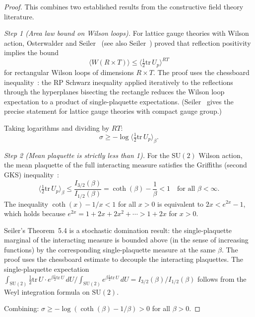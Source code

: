 \documentclass[11pt]{article}
\theoremstyle{definition}
\newcommand{\SU}{\mathrm{SU}}
\newcommand{\tr}{\mathrm{tr}}
\begin{document}
\begin{proof}
This combines two established results from the constructive field
theory literature.

\emph{Step 1 (Area law bound on Wilson loops).}
For lattice gauge theories with Wilson action,
Osterwalder and Seiler~\cite{OS78} (see also
Seiler~\cite[Chapter~6]{Seiler82}) proved that reflection positivity
implies the bound
\begin{equation}\label{eq:wilson-area}
\langle W(R\times T)\rangle
\le\bigl\langle\tfrac{1}{2}\tr\,U_p\bigr\rangle^{RT}
\end{equation}
for rectangular Wilson loops of dimensions $R\times T$.  The proof
uses the chessboard inequality~\cite[Theorem~4.1]{Seiler82}:
the RP Schwarz inequality applied iteratively to the reflections
through the hyperplanes bisecting the rectangle reduces the Wilson
loop expectation to a product of single-plaquette expectations.
(Seiler~\cite[Theorem~6.1]{Seiler82} gives the precise statement
for lattice gauge theories with compact gauge group.)

Taking logarithms and dividing by $RT$:
\begin{equation}
\sigma\ge-\log\bigl\langle\tfrac{1}{2}\tr\,U_p\bigr\rangle_\beta.
\end{equation}

\emph{Step 2 (Mean plaquette is strictly less than 1).}
For the $\SU(2)$ Wilson action, the mean plaquette of the full
interacting measure satisfies the Griffiths (second GKS)
inequality~\cite[Theorem~5.4]{Seiler82}:
\begin{equation}\label{eq:griffiths}
\bigl\langle\tfrac{1}{2}\tr\,U_p\bigr\rangle_\beta
\le\frac{I_{3/2}(\beta)}{I_{1/2}(\beta)}
=\coth(\beta)-\frac{1}{\beta}<1\quad\text{for all $\beta<\infty$.}
\end{equation}
The inequality $\coth(x)-1/x<1$ for all $x>0$ is equivalent
to $2x<e^{2x}-1$, which holds because
$e^{2x}=1+2x+2x^2+\cdots>1+2x$ for $x>0$.

Seiler's Theorem~5.4 is a stochastic domination result: the
single-plaquette marginal of the interacting measure is bounded
above (in the sense of increasing functions) by the corresponding
single-plaquette measure at the same $\beta$.  The proof uses
the chessboard estimate to decouple the interacting plaquettes.
The single-plaquette expectation
$\int_{\SU(2)}\frac{1}{2}\tr\,U\cdot
e^{\beta\frac{1}{2}\tr\,U}\,dU
/\int_{\SU(2)}e^{\beta\frac{1}{2}\tr\,U}\,dU
=I_{3/2}(\beta)/I_{1/2}(\beta)$
follows from the Weyl integration formula on $\SU(2)$.

Combining: $\sigma\ge-\log(\coth(\beta)
-1/\beta)>0$ for all $\beta>0$.
\end{proof}
\end{document}
